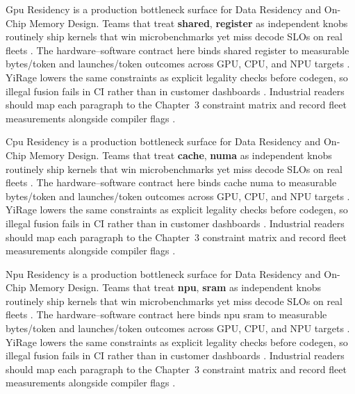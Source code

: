 Gpu Residency is a production bottleneck surface for Data Residency and On-Chip Memory Design. Teams that treat \textbf{shared}, \textbf{register} as independent knobs routinely ship kernels that win microbenchmarks yet miss decode SLOs on real fleets \citep{taxbreak2026,semianalysis2024tma}. The hardware--software contract here binds shared register to measurable bytes/token and launches/token outcomes across GPU, CPU, and NPU targets \citep{memoryfloor2026,amd2024xdna}. YiRage lowers the same constraints as explicit legality checks before codegen, so illegal fusion fails in CI rather than in customer dashboards \citep{nvidia2022hopper,amd2024aie}. Industrial readers should map each paragraph to the Chapter~3 constraint matrix and record fleet measurements alongside compiler flags \citep{semianalysis2024tma,dlbook}.

Cpu Residency is a production bottleneck surface for Data Residency and On-Chip Memory Design. Teams that treat \textbf{cache}, \textbf{numa} as independent knobs routinely ship kernels that win microbenchmarks yet miss decode SLOs on real fleets \citep{memoryfloor2026,amd2024xdna}. The hardware--software contract here binds cache numa to measurable bytes/token and launches/token outcomes across GPU, CPU, and NPU targets \citep{nvidia2022hopper,amd2024aie}. YiRage lowers the same constraints as explicit legality checks before codegen, so illegal fusion fails in CI rather than in customer dashboards \citep{semianalysis2024tma,dlbook}. Industrial readers should map each paragraph to the Chapter~3 constraint matrix and record fleet measurements alongside compiler flags \citep{amd2024xdna,dao2022flashattention}.

Npu Residency is a production bottleneck surface for Data Residency and On-Chip Memory Design. Teams that treat \textbf{npu}, \textbf{sram} as independent knobs routinely ship kernels that win microbenchmarks yet miss decode SLOs on real fleets \citep{nvidia2022hopper,amd2024aie}. The hardware--software contract here binds npu sram to measurable bytes/token and launches/token outcomes across GPU, CPU, and NPU targets \citep{semianalysis2024tma,dlbook}. YiRage lowers the same constraints as explicit legality checks before codegen, so illegal fusion fails in CI rather than in customer dashboards \citep{amd2024xdna,dao2022flashattention}. Industrial readers should map each paragraph to the Chapter~3 constraint matrix and record fleet measurements alongside compiler flags \citep{amd2024aie,kwon2023vllm}.


